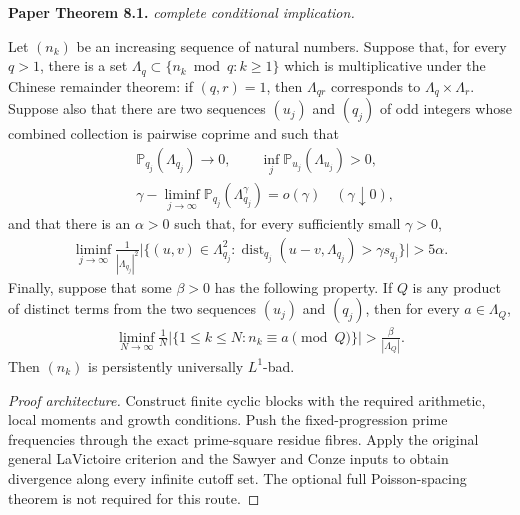 \begin{theorem}
\label{persistent_criterion}
\leanok
\par\medskip\noindent\textbf{Paper Theorem 8.1.} \textit{complete conditional implication.}\par
Let $(n_k)$ be an increasing sequence of natural numbers.  Suppose that, for
every $q>1$, there is a set $\Lambda_q\subset\{n_k\bmod q:k\geq1\}$
which is multiplicative under the Chinese remainder theorem: if $(q,r)=1$,
then $\Lambda_{qr}$ corresponds to $\Lambda_q\times\Lambda_r$. Suppose also that there are two sequences \((u_j)\) and \((q_j)\) of
odd integers whose combined collection is pairwise coprime and such that
\begin{align}
 &\mathbb P_{q_j}(\Lambda_{q_j})\longrightarrow0,
 \qquad
 \inf_j\mathbb P_{u_j}(\Lambda_{u_j})>0,
 \\
 &\gamma-\liminf_{j\to\infty}
       \mathbb P_{q_j}(\Lambda_{q_j}^{\gamma})=o(\gamma)
       \quad(\gamma\downarrow0),
\end{align}
and that there is an $\alpha>0$ such that, for every sufficiently small
$\gamma>0$,
\begin{align}
 \liminf_{j\to\infty}\frac1{|\Lambda_{q_j}|^2}
 \big|\{(u,v)\in\Lambda_{q_j}^2:
   \operatorname{dist}_{q_j}(u-v,\Lambda_{q_j})>
       \gamma s_{q_j}\}\big|>5\alpha.             
\end{align}
Finally, suppose that some $\beta>0$ has the following property. If \(Q\) is any product of distinct terms from the two sequences
\((u_j)\) and \((q_j)\), then for every \(a\in\Lambda_Q\),
\begin{align}
 \liminf_{N\to\infty}\frac1N
 \big|\{1\leq k\leq N:n_k\equiv a\pmod Q\}\big|
       >\frac{\beta}{|\Lambda_Q|}.                 
\end{align}
Then $(n_k)$ is persistently universally $L^1$-bad.
\end{theorem}
\begin{proof}[Proof architecture]
\leanok
Construct finite cyclic blocks with the required arithmetic, local moments and growth conditions. Push the fixed-progression prime frequencies through the exact prime-square residue fibres. Apply the original general LaVictoire criterion and the Sawyer and Conze inputs to obtain divergence along every infinite cutoff set. The optional full Poisson-spacing theorem is not required for this route.
\end{proof}

